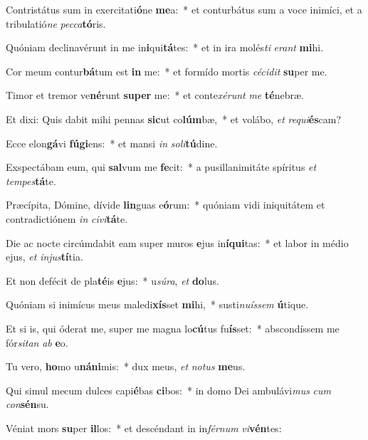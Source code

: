 \item Contristátus sum in exercitati\textbf{ó}ne \textbf{me}a:~* et conturbátus sum a voce inimíci, et a tribulatió\textit{ne} \textit{pec}\textit{ca}\textbf{tó}ris.
\item Quóniam declinavérunt in me in\textbf{i}qui\textbf{tá}tes:~* et in ira molés\textit{ti} \textit{e}\textit{rant} \textbf{mi}hi.
\item Cor meum contur\textbf{bá}tum est \textbf{in} me:~* et formído mortis \textit{cé}\textit{ci}\textit{dit} \textbf{su}per me.
\item Timor et tremor ve\textbf{né}runt \textbf{su}\textbf{per} me:~* et conte\textit{xé}\textit{runt} \textit{me} \textbf{té}nebræ.
\item Et dixi: Quis dabit mihi pennas \textbf{sic}ut co\textbf{lúm}bæ,~* et volábo, \textit{et} \textit{re}\textit{qui}\textbf{és}cam?
\item Ecce elon\textbf{gá}vi \textbf{fú}\textbf{gi}ens:~* et mansi \textit{in} \textit{so}\textit{li}\textbf{tú}dine.
\item Exspectábam eum, qui \textbf{sal}vum me \textbf{fe}cit:~* a pusillanimitáte spíritus \textit{et} \textit{tem}\textit{pes}\textbf{tá}te.
\item Præcípita, Dómine, dívide \textbf{lin}guas e\textbf{ó}rum:~* quóniam vidi iniquitátem et contradictiónem \textit{in} \textit{ci}\textit{vi}\textbf{tá}te.
\item Die ac nocte circúmdabit eam super muros \textbf{e}jus in\textbf{í}\textbf{qui}tas:~* et labor in médio ejus, \textit{et} \textit{in}\textit{jus}\textbf{tí}tia.
\item Et non defécit de pla\textbf{té}is \textbf{e}jus:~* u\textit{sú}\textit{ra}, \textit{et} \textbf{do}lus.
\item Quóniam si inimícus meus maledi\textbf{xís}set \textbf{mi}hi,~* susti\textit{nu}\textit{ís}\textit{sem} \textbf{ú}tique.
\item Et si is, qui óderat me, super me magna lo\textbf{cú}tus fu\textbf{ís}set:~* abscondíssem me fór\textit{si}\textit{tan} \textit{ab} \textbf{e}o.
\item Tu vero, \textbf{ho}mo u\textbf{ná}\textbf{ni}mis:~* dux meus, \textit{et} \textit{no}\textit{tus} \textbf{me}us.
\item Qui simul mecum dulces capi\textbf{é}bas \textbf{ci}bos:~* in domo Dei ambulávi\textit{mus} \textit{cum} \textit{con}\textbf{sén}su.
\item Véniat mors \textbf{su}per \textbf{il}los:~* et descéndant in in\textit{fér}\textit{num} \textit{vi}\textbf{vén}tes:

